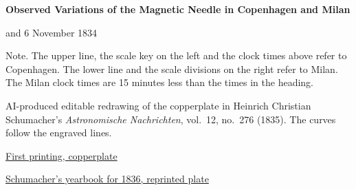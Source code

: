 \clearpage
\thispagestyle{empty}
\begin{center}
{\Large\bfseries Observed Variations of the Magnetic Needle in Copenhagen and Milan\par}
 and 6 November 1834\par
\medskip
\begingroup
\def\GaussCopenhagenPlateMarkers{\node[anchor=west,font=\tiny,fill=white,inner sep=.5pt] at (1244,385) {5 Nov. a.m.};
\node[anchor=west,font=\tiny,fill=white,inner sep=.5pt] at (1659,385) {p.m.};
\node[anchor=west,font=\tiny,fill=white,inner sep=.5pt] at (2277,385) {6 Nov. a.m.};
\node[anchor=west,font=\tiny,fill=white,inner sep=.5pt] at (2894,385) {p.m.};}

\endgroup
\end{center}
\noindent Note. The upper line, the scale key on the left and the clock times above refer to Copenhagen. The lower line and the scale divisions on the right refer to Milan. The Milan clock times are 15 minutes less than the times in the heading.
\par\medskip
\noindent AI-produced editable redrawing of the copperplate in Heinrich Christian Schumacher’s \textit{Astronomische Nachrichten}, vol.~12, no.~276 (1835). The curves follow the engraved lines.
\par\medskip
\noindent\href{https://www.digitale-sammlungen.de/view/bsb10049437?page=231}{First printing, copperplate}\par
\noindent\href{https://www.digitale-sammlungen.de/view/bsb11040033?page=277}{Schumacher’s yearbook for 1836, reprinted plate}\par
\clearpage

